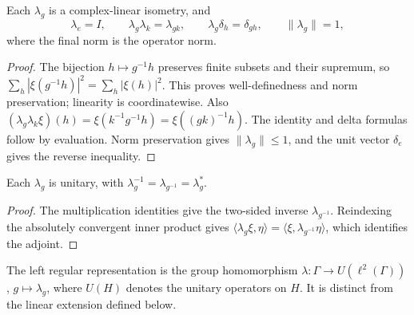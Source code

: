 \begin{lemma}\label{lem:left-translation-laws}
\leanok
{}
Each $\lambda_g$ is a complex-linear isometry, and
\[
 \lambda_e=I,\qquad \lambda_g\lambda_k=\lambda_{gk},\qquad
 \lambda_g\delta_h=\delta_{gh},\qquad \|\lambda_g\|=1,
\]
where the final norm is the operator norm.
\end{lemma}
\begin{proof}
\leanok
The bijection $h\mapsto g^{-1}h$ preserves finite subsets and their
supremum, so $\sum_h|\xi(g^{-1}h)|^2=\sum_h|\xi(h)|^2$.
This proves well-definedness and norm preservation; linearity is
coordinatewise. Also
$(\lambda_g\lambda_k\xi)(h)=\xi(k^{-1}g^{-1}h)=\xi((gk)^{-1}h)$.
The identity and delta formulas follow by evaluation.
Norm preservation gives $\|\lambda_g\|\leq1$, and the unit vector
$\delta_e$ gives the reverse inequality.
\end{proof}

\begin{proposition}\label{prop:left-translation-unitary}
\leanok
{}
Each $\lambda_g$ is unitary, with
$\lambda_g^{-1}=\lambda_{g^{-1}}=\lambda_g^*$.
\end{proposition}
\begin{proof}
\leanok
The multiplication identities give the two-sided inverse
$\lambda_{g^{-1}}$. Reindexing the absolutely convergent inner product
gives $\langle\lambda_g\xi,\eta\rangle
=\langle\xi,\lambda_{g^{-1}}\eta\rangle$, which identifies the adjoint.
\end{proof}

\begin{definition}\label{def:left-regular-representation}
\leanok
{}
The left regular representation is the group homomorphism
$\lambda:\Gamma\to U(\ell^2(\Gamma))$, $g\mapsto\lambda_g$,
where $U(H)$ denotes the unitary operators on $H$.
It is distinct from the linear extension defined below.
\end{definition}

